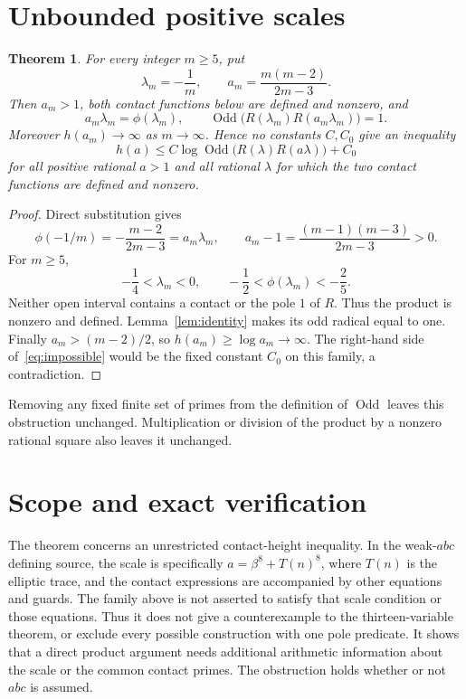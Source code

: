 \documentclass[11pt,a4paper]{article}
\newtheorem{theorem}{Theorem}[section]
\DeclareMathOperator{\Odd}{Odd}
\begin{document}
\section{Unbounded positive scales}

\begin{theorem}\label{thm:obstruction}
For every integer $m\ge5$, put
\[
 \lambda_m=-\frac1m,\qquad
 a_m=\frac{m(m-2)}{2m-3}.
\]
Then $a_m>1$, both contact functions below are defined and nonzero,
and
\[
 a_m\lambda_m=\phi(\lambda_m),\qquad
 \Odd\bigl(R(\lambda_m)R(a_m\lambda_m)\bigr)=1.
\]
Moreover $h(a_m)\longrightarrow\infty$ as $m\longrightarrow\infty$.
Hence no constants $C,C_0$ give an inequality
\begin{equation}\label{eq:impossible}
 h(a)\le C\log\Odd\bigl(R(\lambda)R(a\lambda)\bigr)+C_0
\end{equation}
for all positive rational $a>1$ and all rational $\lambda$ for
which the two contact functions are defined and nonzero.
\end{theorem}
\begin{proof}
Direct substitution gives
\[
 \phi(-1/m)=-\frac{m-2}{2m-3}=a_m\lambda_m,
 \qquad a_m-1=\frac{(m-1)(m-3)}{2m-3}>0.
\]
For $m\ge5$,
\[
 -\frac14<\lambda_m<0,
 \qquad -\frac12<\phi(\lambda_m)<-\frac25.
\]
Neither open interval contains a contact or the pole $1$ of $R$.
Thus the product is nonzero and defined. Lemma~\ref{lem:identity}
makes its odd radical equal to one. Finally
$a_m>(m-2)/2$, so $h(a_m)\ge\log a_m\longrightarrow\infty$.
The right-hand side of~\eqref{eq:impossible} would be the fixed
constant $C_0$ on this family, a contradiction.
\end{proof}

Removing any fixed finite set of primes from the definition of
$\Odd$ leaves this obstruction unchanged. Multiplication or division
of the product by a nonzero rational square also leaves it unchanged.

\section{Scope and exact verification}

The theorem concerns an unrestricted contact-height inequality.
In the weak-$abc$ defining source, the scale is specifically
$a=\beta^8+T(n)^8$, where $T(n)$ is the elliptic trace, and the
contact expressions are accompanied by other equations and guards.
The family above is not asserted to satisfy that scale condition or
those equations. Thus it does not give a counterexample to the
thirteen-variable theorem, or exclude every possible construction
with one pole predicate. It shows that a direct product argument
needs additional arithmetic information about the scale or the
common contact primes. The obstruction holds whether or not $abc$
is assumed.
\end{document}
